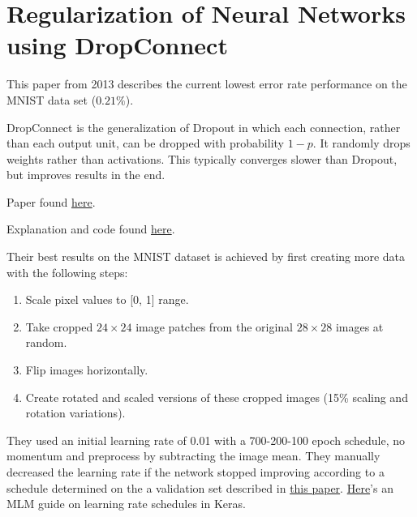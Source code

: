 \documentclass[a4paper, 11pt]{article}
\begin{document}
\section{Regularization of Neural Networks using DropConnect}
This paper from 2013 describes the current lowest error rate performance on the MNIST data set ($0.21\%$).

DropConnect is the generalization of Dropout in which each connection, rather than each output unit, can be dropped with probability $1-p$.
It randomly drops weights rather than activations.
This typically converges slower than Dropout, but improves results in the end.

Paper found \href{https://cs.nyu.edu/~wanli/dropc/dropc.pdf}{\color{blue}here}.

Explanation and code found \href{https://cs.nyu.edu/~wanli/dropc/}{\color{blue}here}.

Their best results on the MNIST dataset is achieved by first creating more data with the following steps:
\begin{enumerate}[topsep=6pt,itemsep=3pt]
	\item Scale pixel values to [0, 1] range.
	\item Take cropped $24\times24$ image patches from the original $28\times28$ images at random.
	\item Flip images horizontally.
	\item Create rotated and scaled versions of these cropped images (15\% scaling and rotation variations).
\end{enumerate}
They used an initial learning rate of 0.01 with a 700-200-100 epoch schedule, no momentum and preprocess by subtracting the image mean.
They manually decreased the learning rate if the network stopped improving according to a schedule determined on the a validation set described in \href{https://www.cs.toronto.edu/~kriz/learning-features-2009-TR.pdf}{\color{blue}this paper}.
\href{https://machinelearningmastery.com/using-learning-rate-schedules-deep-learning-models-python-keras/}{\color{blue}Here}'s an MLM guide on learning rate schedules in Keras.
\end{document}

